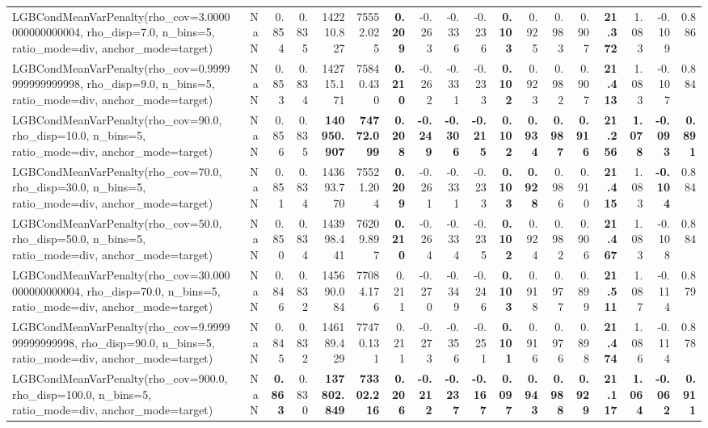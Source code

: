 \documentclass[11pt]{article}
\theoremstyle{plain}
\theoremstyle{definition}
\newcommand{\1}{\mathbf{1}}
\begin{document}
\begin{table}[htbp]
{\begin{tabular}{lrrrrrrrrrrrrrrrrr}
LGBCondMeanVarPenalty(rho\_cov=3.0000000000000004, rho\_disp=7.0, n\_bins=5, ratio\_mode=div, anchor\_mode=target) & NaN & 0.854 & 0.835 & 142210.827 & 75552.025 & \textbf{0.209} & -0.263 & -0.336 & -0.236 & \textbf{0.103} & 0.925 & 0.983 & 0.907 & \textbf{21.372} & 1.083 & -0.109 & 0.886 \\
LGBCondMeanVarPenalty(rho\_cov=0.9999999999999998, rho\_disp=9.0, n\_bins=5, ratio\_mode=div, anchor\_mode=target) & NaN & 0.853 & 0.834 & 142715.171 & 75840.430 & \textbf{0.210} & -0.262 & -0.331 & -0.233 & \textbf{0.102} & 0.923 & 0.982 & 0.907 & \textbf{21.413} & 1.083 & -0.107 & 0.884 \\
LGBCondMeanVarPenalty(rho\_cov=90.0, rho\_disp=10.0, n\_bins=5, ratio\_mode=div, anchor\_mode=target) & NaN & 0.856 & 0.835 & \textbf{140950.907} & \textbf{74772.099} & \textbf{0.208} & \textbf{-0.249} & \textbf{-0.306} & \textbf{-0.215} & \textbf{0.102} & \textbf{0.934} & \textbf{0.987} & \textbf{0.916} & \textbf{21.256} & \textbf{1.078} & \textbf{-0.093} & \textbf{0.891} \\
LGBCondMeanVarPenalty(rho\_cov=70.0, rho\_disp=30.0, n\_bins=5, ratio\_mode=div, anchor\_mode=target) & NaN & 0.851 & 0.834 & 143693.770 & 75521.204 & \textbf{0.209} & -0.261 & -0.331 & -0.233 & \textbf{0.103} & \textbf{0.928} & 0.986 & 0.910 & \textbf{21.415} & 1.083 & \textbf{-0.104} & 0.884 \\
LGBCondMeanVarPenalty(rho\_cov=50.0, rho\_disp=50.0, n\_bins=5, ratio\_mode=div, anchor\_mode=target) & NaN & 0.850 & 0.834 & 143998.441 & 76209.897 & \textbf{0.210} & -0.264 & -0.334 & -0.235 & \textbf{0.102} & 0.924 & 0.982 & 0.906 & \textbf{21.467} & 1.083 & -0.108 & 0.884 \\
LGBCondMeanVarPenalty(rho\_cov=30.000000000000004, rho\_disp=70.0, n\_bins=5, ratio\_mode=div, anchor\_mode=target) & NaN & 0.846 & 0.832 & 145690.084 & 77084.176 & 0.211 & -0.270 & -0.349 & -0.246 & \textbf{0.103} & 0.918 & 0.977 & 0.899 & \textbf{21.511} & 1.087 & -0.114 & 0.879 \\
LGBCondMeanVarPenalty(rho\_cov=9.999999999999998, rho\_disp=90.0, n\_bins=5, ratio\_mode=div, anchor\_mode=target) & NaN & 0.845 & 0.832 & 146189.429 & 77470.131 & 0.211 & -0.273 & -0.356 & -0.251 & \textbf{0.101} & 0.916 & 0.976 & 0.898 & \textbf{21.474} & 1.086 & -0.114 & 0.878 \\
LGBCondMeanVarPenalty(rho\_cov=900.0, rho\_disp=100.0, n\_bins=5, ratio\_mode=div, anchor\_mode=target) & NaN & \textbf{0.863} & 0.830 & \textbf{137802.849} & \textbf{73302.216} & \textbf{0.206} & \textbf{-0.212} & \textbf{-0.237} & \textbf{-0.167} & \textbf{0.097} & \textbf{0.943} & \textbf{0.988} & \textbf{0.929} & \textbf{21.117} & \textbf{1.064} & \textbf{-0.062} & \textbf{0.911} \\

\end{tabular}}
\end{table}
\end{document}
